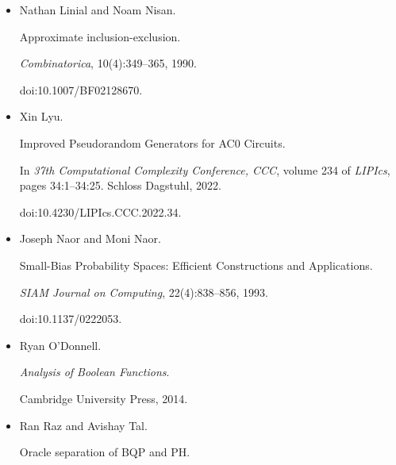 \documentclass[10pt,a4paper]{article}
\begin{document}
\begin{itemize}
Johan Håstad, Benjamin Rossman, Rocco Servedio, and Li-Yang Tan.


An Average-Case Depth Hierarchy Theorem for Boolean Circuits.


\emph{Journal of the ACM}, 64(5), 2017.


doi:10.1145/3095799.





\item[] 
[16]

Nathan Linial and Noam Nisan.


Approximate inclusion-exclusion.


\emph{Combinatorica}, 10(4):349–365, 1990.


doi:10.1007/BF02128670.





\item[] 
[17]

Xin Lyu.


Improved Pseudorandom Generators for AC0 Circuits.


In \emph{37th Computational Complexity Conference, CCC}, volume 234
of \emph{LIPIcs}, pages 34:1–34:25. Schloss Dagstuhl, 2022.


doi:10.4230/LIPIcs.CCC.2022.34.





\item[] 
[18]

Joseph Naor and Moni Naor.


Small-Bias Probability Spaces: Efficient Constructions and
Applications.


\emph{SIAM Journal on Computing}, 22(4):838–856, 1993.


doi:10.1137/0222053.





\item[] 
[19]

Ryan O’Donnell.


\emph{Analysis of Boolean Functions}.


Cambridge University Press, 2014.





\item[] 
[20]

Ran Raz and Avishay Tal.


Oracle separation of BQP and PH.



\end{itemize}
\end{document}
